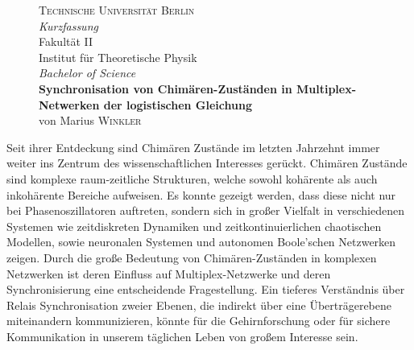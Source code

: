\newpage\leavevmode\thispagestyle{empty}\newpage

\thispagestyle{empty}


\begin{figure}
    \centering
    {\large \textsc{Technische Universität Berlin}}\\
    \vspace{0.5cm}
    {\huge \emph{Kurzfassung}}\\
    \vspace{0.2cm}
    Fakultät II \\
    Institut für Theoretische Physik \\
    \vspace{0.3cm}
    \textit{Bachelor of Science}\\
    \vspace{0.3cm}
    \textbf{Synchronisation von Chimären-Zuständen in Multiplex-Netwerken der logistischen Gleichung}\\
    \vspace{0.2cm}
    von \textcolor{vaukgreen}{Marius \scshape{Winkler}}\\
\end{figure}
\noindent Seit ihrer Entdeckung sind Chimären Zustände im letzten Jahrzehnt immer weiter ins Zentrum des wissenschaftlichen Interesses gerückt. Chimären Zustände sind komplexe raum-zeitliche Strukturen, welche sowohl kohärente als auch inkohärente Bereiche aufweisen. Es konnte gezeigt werden, dass diese nicht nur bei Phasenoszillatoren auftreten, sondern sich in großer Vielfalt in verschiedenen Systemen wie zeitdiskreten Dynamiken und zeitkontinuierlichen chaotischen Modellen, sowie neuronalen Systemen und autonomen Boole'schen Netzwerken zeigen. Durch die große Bedeutung von Chimären-Zuständen in komplexen Netzwerken ist deren Einfluss auf Multiplex-Netzwerke und deren Synchronisierung eine entscheidende Fragestellung. Ein tieferes Verständnis über Relais Synchronisation zweier Ebenen, die indirekt über eine Überträgerebene miteinandern kommunizieren, könnte für die Gehirnforschung oder für sichere Kommunikation in unserem täglichen Leben von großem Interesse sein.

